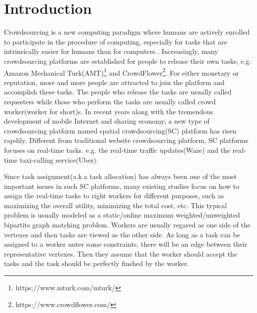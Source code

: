 \section{Introduction}
Crowdsourcing is a new computing paradigm where humans are actively enrolled to participate in the procedure of computing, 
especially for tasks that are intrinsically easier for humans than for computers \cite{TongCS17}.
Increasingly, many crowdsourcing platforms are established for people to release their own tasks, e.g. Amazon Mechanical Turk(AMT)\footnote{https://www.mturk.com/mturk/} and CrowdFlower\footnote{https://www.crowdflower.com/}.
For either monetary or reputation, more and more people are attracted to join the platform and accomplish these tasks.
The people who release the tasks are usually called requesters while those who perform the tasks are usually called crowd worker(worker for short)s.
In recent years along with the tremendous development of mobile Internet and sharing economy, 
a new type of crowdsourcing platform named spatial crowdsourcing(SC) platform has risen rapdily.
Different from traditional website crowdsourcing platform, SC platforms focuses on real-time tasks.
e.g. the real-time traffic updates(Waze) and the real-time taxi-calling service(Uber).

Since task assignment(a.k.a task allocation) has always been one of the most important issues in such SC platforms,
many existing studies focus on how to assign the real-time tasks to right workers for different purposes, 
such as maximizing the overall utility, minimizing the total cost, etc.
This typical problem is usually modeled as a static/online maximum weighted/unweighted bipartite graph matching problem.
Workers are usually regared as one side of the vertexes and then tasks are viewed as the other side.
As long as a task can be assigned to a worker unter some constraints, there will be an edge between their representative vertexes.
Then they assume that the worker should accept the tasks and the task should be perfectly finshed by the worker.

